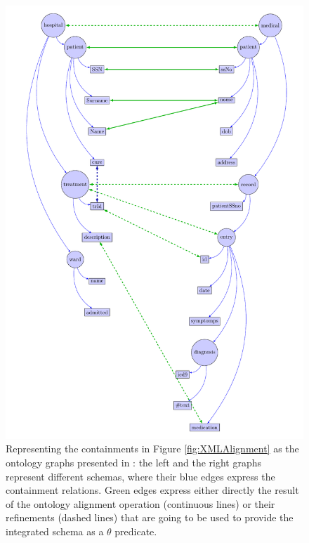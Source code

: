 \begin{figure}
	\includegraphics[width=\textwidth]{fig/03joins/ontologyLeftRight}
	\caption{Representing the containments in Figure \vref{fig:XMLAlignment} as the ontology graphs presented in \cite{euzenat2013d}: the left and the right graphs represent different schemas, where their blue edges express the containment relations. Green edges express either directly the result of the ontology alignment operation (continuous lines) or their refinements (dashed lines) that are going to be used to provide the integrated schema as a $\theta$ predicate.}
	\label{fig:semistructAsGraphCont}
\end{figure}\begin{figure}

\end{figure}
